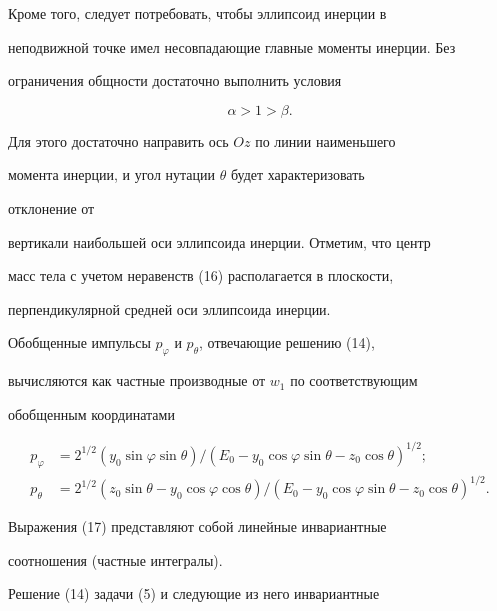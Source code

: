 Кроме того, следует потребовать, чтобы эллипсоид инерции в


неподвижной точке имел несовпадающие главные моменты инерции. Без


ограничения общности достаточно выполнить условия


\begin{equation}


\alpha>1>\beta.


\end{equation}


Для этого достаточно направить ось $Oz$ по линии наименьшего


момента инерции, и угол нутации $\theta$ будет характеризовать


отклонение от


вертикали наибольшей оси эллипсоида инерции. Отметим, что центр


масс тела с учетом неравенств (16) располагается в плоскости,


перпендикулярной средней оси эллипсоида инерции.





Обобщенные импульсы $p_\varphi$ и $p_\theta$, отвечающие решению (14),


вычисляются как частные производные от $w_1$ по соответствующим


обобщенным координатами


\begin{equation}


\begin{split}


p_\varphi&=2^{1/2}(y_0\sin\varphi\sin\theta)/


(E_0-y_0\cos\varphi\sin\theta-z_0\cos\theta)^{1/2};\\


p_\theta&=2^{1/2}(z_0\sin\theta-y_0\cos\varphi\cos\theta)


/(E_0-y_0\cos\varphi\sin\theta-z_0\cos\theta)^{1/2}.


\end{split}


\end{equation}


Выражения (17) представляют собой линейные инвариантные


соотношения (частные интегралы).





Решение (14) задачи (5) и следующие из него инвариантные


